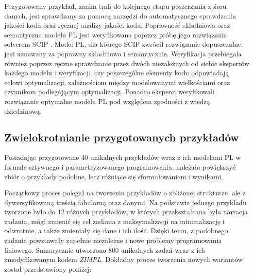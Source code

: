 Przygotowany przykład, zanim trafi do kolejnego etapu poszerzania zbioru danych, jest sprawdzany za pomocą narzędzi do automatycznego sprawdzania jakości kodu oraz ręcznej analizy jakości kodu. Poprawność składniowa oraz semantyczna modelu PL jest weryfikowana poprzez próbę jego rozwiązania solverem SCIP \cite{BolusaniEtal2024ZR}. Model PL, dla którego SCIP zwrócił rozwiązanie dopuszczalne, jest uznawany za poprawny składniowo i semantycznie. Weryfikacja przebiegała również poprzez ręczne sprawdzanie przez dwóch niezależnych od siebie ekspertów każdego modelu i weryfikacji, czy poszczególne elementy kodu odpowiadają celowi optymalizacji, zależnościom między modelowanymi wielkościami oraz czynnikom podlegającym optymalizacji. Ponadto eksperci weryfikowali rozwiązanie optymalne modelu PL pod względem zgodności z wiedzą dziedzinową.

\subsection{Zwielokrotnianie przygotowanych przykładów}

Posiadając przygotowane 40 unikalnych przykładów wraz z ich modelami PL w formule sztywnego i parametryzowanego programowania, należało powiększyć zbiór o przykłady podobne, lecz różniące się sformułowaniem i wynikami.

Początkowy proces polegał na tworzeniu przykładów o zbliżonej strukturze, ale z dywersyfikowaną treścią fabularną oraz danymi. Na podstawie jednego przykładu tworzone było do 12 różnych przykładów, w których przekształcana była narracja zadania, mógł zmienić się cel zadania z maksymalizacji na minimalizację i odwrotnie, a także zmieniały się dane i ich ilość. Dzięki temu, z podobnego zadania powstawały zupełnie niezależne i nowe problemy programowania liniowego. Sumarycznie utworzono 800 unikalnych zadań wraz z ich zmodyfikowanym kodem  \textit{ZIMPL}.
Dokładny proces tworzenia nowych wariantów został przedstawiony poniżej:

